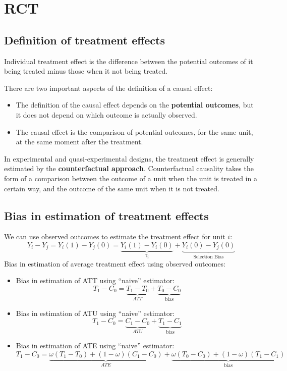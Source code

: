 \documentclass[
]{ctexart}
\providecommand{\tightlist}{%
  \setlength{\itemsep}{0pt}\setlength{\parskip}{0pt}}
\newcommand{\0}{\textbf 0}
\newcommand{\1}{\textbf 1}
\begin{document}
\hypertarget{rct}{%
\section{RCT}\label{rct}}

\hypertarget{definition-of-treatment-effects}{%
\subsection{Definition of treatment
effects}\label{definition-of-treatment-effects}}

Individual treatment effect is the difference between the potential
outcomes of it being treated minus those when it not being treated.

There are two important aspects of the definition of a causal effect:

\begin{itemize}
\tightlist
\item
  The definition of the causal effect depends on the \textbf{potential
  outcomes}, but it does not depend on which outcome is actually
  observed.
\item
  The causal effect is the comparison of potential outcomes, for the
  same unit, at the same moment after the treatment.
\end{itemize}

In experimental and quasi-experimental designs, the treatment effect is
generally estimated by the \textbf{counterfactual approach}.
Counterfactual causality takes the form of a comparison between the
outcome of a unit when the unit is treated in a certain way, and the
outcome of the same unit when it is not treated.

\hypertarget{bias-in-estimation-of-treatment-effects}{%
\subsection{Bias in estimation of treatment
effects}\label{bias-in-estimation-of-treatment-effects}}

We can use observed outcomes to estimate the treatment effect for unit
\(i\): \[
Y_i - Y_j = Y_i(1) - Y_j(0) = \underbrace{Y_i(1) - Y_i(0)}_{\gamma_i} + \underbrace{Y_i(0) - Y_j(0)}_{\text{Selection Bias}}
\] Bias in estimation of average treatment effect using observed
outcomes:

\begin{itemize}
\item
  Bias in estimation of ATT using ``naive'' estimator: \[
  T_1 - C_0 = \underbrace{T_1-T_0}_{ATT}+\underbrace{T_0-C_0}_\text{bias}
  \]
\item
  Bias in estimation of ATU using ``naive'' estimator: \[
  T_1 - C_0 = \underbrace{C_1-C_0}_{ATU}+\underbrace{T_1-C_1}_\text{bias}
  \]
\item
  Bias in estimation of ATE using ``naive'' estimator: \[
  T_1 - C_0 = \underbrace{\omega (T_1-T_0) + (1-\omega)(C_1-C_0)}_{ATE}+\underbrace{\omega (T_0 -C_0) + (1-\omega)(T_1-C_1)}_\text{bias}
  \]
\end{itemize}
\end{document}
